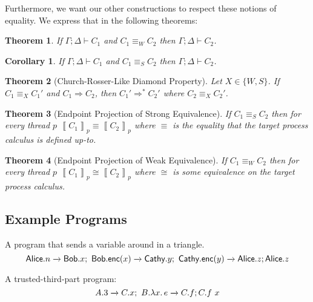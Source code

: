 \documentclass{article}
\newtheorem{thm}{Theorem}
\newtheorem{cor}{Corollary}
\theoremstyle{definition}
\newcommand{\To}{\Rightarrow}
\newcommand{\ceq}{\equiv}
\newcommand{\own}[2]{#1.#2}
\newcommand{\send}[3][]{#2\nolinebreak \mathrel{\xrightarrow{#1}}\nolinebreak #3}
\newcommand{\proves}{\vdash}
\newcommand{\transb}[1]{\left\llbracket #1 \right\rrbracket}
\begin{document}
Furthermore, we want our other constructions to respect these notions of equality.
We express that in the following theorems:
\begin{thm}
  If $\Gamma; \Delta \proves C_1$ and $C_1 \ceq_W C_2$ then $\Gamma; \Delta \proves C_2$.
\end{thm}
\begin{cor}
  If $\Gamma; \Delta \proves C_1$ and $C_1 \ceq_S C_2$ then $\Gamma; \Delta \proves C_2$.
\end{cor}

\begin{thm}[Church-Rosser-Like Diamond Property]
  Let $X \in \{W,S\}$.
  If $C_1 \ceq_X C_1'$ and $C_1 \To C_2$, then $C_1' \To^\ast C_2'$ where $C_2 \ceq_X C_2'$.
\end{thm}

\begin{thm}[Endpoint Projection of Strong Equivalence]
  If $C_1 \ceq_S C_2$ then for every thread $p$ $\transb{C_1}_p \equiv \transb{C_2}_p$ where $\equiv$ is the equality that the target process calculus is defined up-to.
\end{thm}
\begin{thm}[Endpoint Projection of Weak Equivalence]
  If $C_1 \ceq_W C_2$ then for every thread $p$ $\transb{C_1}_p \cong \transb{C_2}_p$ where $\cong$ is some equivalence on the target process calculus.
\end{thm}
\fi

\subsection{Example Programs}
A program that sends a variable around in a triangle.
$$\send{\own{\textsf{Alice}}{n}}{\own{\textsf{Bob}}{x}};~\send{\own{\textsf{Bob}}{\textsf{enc}(x)}}{\own{\textsf{Cathy}}{y}};~\send{\own{\textsf{Cathy}}{\textsf{enc}(y)}}{\own{\textsf{Alice}}{z}}; \own{\textsf{Alice}}{z}$$

A trusted-third-part program:
$$\send{\own{A}{3}}{\own{C}{x}};~\send{\own{B}{\lambda x.\,e}}{\own{C}{f}}; \own{C}{f~x}$$


\end{document}
